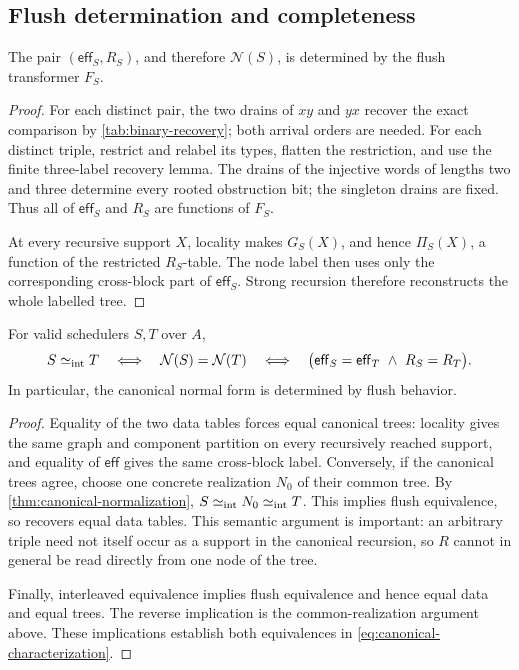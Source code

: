 \subsection{Flush determination and completeness}

\begin{lemma}
\label{lem:canonical-flush-determination}
The pair \((\mathsf{eff}_S,R_S)\), and therefore \(\mathcal N(S)\), is
determined by the flush transformer \(F_S\).
\end{lemma}

\begin{proof}
For each distinct pair, the two drains of \(xy\) and \(yx\) recover the exact
comparison by \autoref{tab:binary-recovery}; both arrival orders are needed.  For
each distinct triple, restrict and relabel its types, flatten the restriction,
and use the finite three-label recovery lemma.  The drains of the injective
words of lengths two and three determine every rooted obstruction bit; the
singleton drains are fixed.  Thus all of \(\mathsf{eff}_S\) and \(R_S\) are
functions of \(F_S\).

At every recursive support \(X\), locality makes \(G_S(X)\), and hence
\(\Pi_S(X)\), a function of the restricted \(R_S\)-table.  The node label then
uses only the corresponding cross-block part of \(\mathsf{eff}_S\).  Strong
recursion therefore reconstructs the whole labelled tree.
\end{proof}

\begin{theorem}
\label{thm:canonical-characterization}
For valid schedulers \(S,T\) over \(A\),
\begin{equation}
  S\mathrel{\simeq_{\mathrm{int}}} T
  \quad\Longleftrightarrow\quad
  \mathcal N(S)=\mathcal N(T)
  \quad\Longleftrightarrow\quad
  \bigl(\mathsf{eff}_S=\mathsf{eff}_T
        \ \land\ R_S=R_T\bigr).
  \label{eq:canonical-characterization}
\end{equation}
In particular, the canonical normal form is determined by flush behavior.
\end{theorem}

\begin{proof}
Equality of the two data tables forces equal canonical trees: locality gives
the same graph and component partition on every recursively reached support,
and equality of \(\mathsf{eff}\) gives the same cross-block label.  Conversely,
if the canonical trees agree, choose one concrete realization \(N_0\) of
their common tree.  By \autoref{thm:canonical-normalization},
\(S\mathrel{\simeq_{\mathrm{int}}} N_0\mathrel{\simeq_{\mathrm{int}}} T\).  This implies flush equivalence, so
 recovers equal data tables.  This
semantic argument is important: an arbitrary triple need not itself occur as
a support in the canonical recursion, so \(R\) cannot in general be read
directly from one node of the tree.

Finally, interleaved equivalence implies flush equivalence and hence equal
data and equal trees.  The reverse implication is the common-realization
argument above.  These implications establish both equivalences in
\autoref{eq:canonical-characterization}.
\end{proof}
